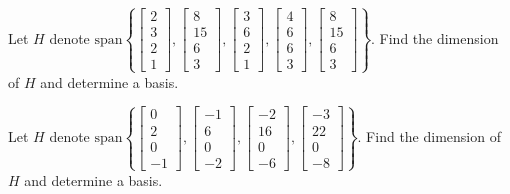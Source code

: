 \documentclass{ximera}
\begin{document}
\begin{problem}\label{prb:5.5} Let $H$ denote $\mbox{span}\left\{ \left[
\begin{array}{r}
2 \\
3 \\
2 \\
1
\end{array}
\right] ,\left[
\begin{array}{r}
8 \\
15 \\
6 \\
3
\end{array}
\right] ,\left[
\begin{array}{r}
3 \\
6 \\
2 \\
1
\end{array}
\right] ,\left[
\begin{array}{r}
4 \\
6 \\
6 \\
3
\end{array}
\right] ,\left[
\begin{array}{r}
8 \\
15 \\
6 \\
3
\end{array}
\right] \right\} .$ Find the dimension of $H$ and determine a basis.
\end{problem}

\begin{problem}\label{prb:5.6} Let $H$ denote $\mbox{span}\left\{ \left[
\begin{array}{r}
0 \\
2 \\
0 \\
-1
\end{array}
\right] ,\left[
\begin{array}{r}
-1 \\
6 \\
0 \\
-2
\end{array}
\right] ,\left[
\begin{array}{r}
-2 \\
16 \\
0 \\
-6
\end{array}
\right] ,\left[
\begin{array}{r}
-3 \\
22 \\
0 \\
-8
\end{array}
\right] \right\} .$ Find the dimension of $H$ and determine a basis.
\end{problem}
\end{document}

